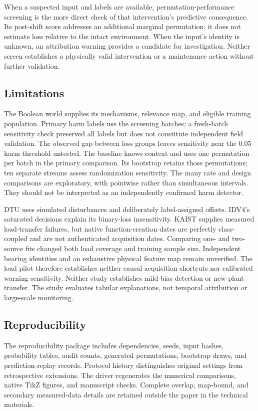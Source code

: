 \documentclass[conference]{IEEEtran}
\begin{document}
When a suspected input and labels are available, permutation-performance screening is the more direct check of that intervention's predictive consequence. Its post-shift score addresses an additional marginal permutation; it does not estimate loss relative to the intact environment. When the input's identity is unknown, an attribution warning provides a candidate for investigation. Neither screen establishes a physically valid intervention or a maintenance action without further validation.

\subsection{Limitations}
The Boolean world supplies its mechanisms, relevance map, and eligible training population. Primary harm labels use the screening batches; a fresh-batch sensitivity check preserved all labels but does not constitute independent field validation. The observed gap between loss groups leaves sensitivity near the 0.05 harm threshold untested. The baseline knows context and uses one permutation per batch in the primary comparison. Its bootstrap retains those permutations; ten separate streams assess randomization sensitivity. The many rate and design comparisons are exploratory, with pointwise rather than simultaneous intervals. They should not be interpreted as an independently confirmed harm detector.

DTU uses simulated disturbances and deliberately label-assigned offsets. IDV4's saturated decisions explain its binary-loss insensitivity. KAIST supplies measured load-transfer failures, but native function-creation dates are perfectly class-coupled and are not authenticated acquisition dates. Comparing one- and two-source fits changed both load coverage and training sample size. Independent bearing identities and an exhaustive physical feature map remain unverified. The load pilot therefore establishes neither causal acquisition shortcuts nor calibrated warning sensitivity. Neither study establishes mild-bias detection or new-plant transfer. The study evaluates tabular explanations, not temporal attribution or large-scale monitoring.

\subsection{Reproducibility}
The reproducibility package includes dependencies, seeds, input hashes, probability tables, audit counts, generated permutations, bootstrap draws, and prediction-replay records. Protocol history distinguishes original settings from retrospective extensions. The driver regenerates the numerical comparisons, native TikZ figures, and manuscript checks. Complete overlap, map-bound, and secondary measured-data details are retained outside the paper in the technical materials.
\end{document}
